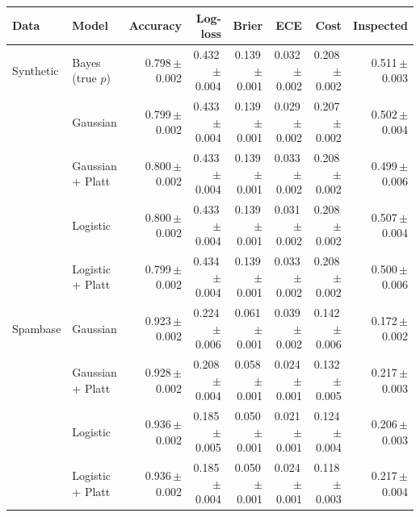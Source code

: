 \begin{tabular}{llrrrrrr}
\toprule
Data & Model & Accuracy & Log-loss & Brier & ECE & Cost & Inspected \\
\midrule
Synthetic & Bayes (true $p$) & 0.798\,{\scriptsize$\pm$0.002} & 0.432\,{\scriptsize$\pm$0.004} & 0.139\,{\scriptsize$\pm$0.001} & 0.032\,{\scriptsize$\pm$0.002} & 0.208\,{\scriptsize$\pm$0.002} & 0.511\,{\scriptsize$\pm$0.003} \\
 & Gaussian & 0.799\,{\scriptsize$\pm$0.002} & 0.433\,{\scriptsize$\pm$0.004} & 0.139\,{\scriptsize$\pm$0.001} & 0.029\,{\scriptsize$\pm$0.002} & 0.207\,{\scriptsize$\pm$0.002} & 0.502\,{\scriptsize$\pm$0.004} \\
 & Gaussian + Platt & 0.800\,{\scriptsize$\pm$0.002} & 0.433\,{\scriptsize$\pm$0.004} & 0.139\,{\scriptsize$\pm$0.001} & 0.033\,{\scriptsize$\pm$0.002} & 0.208\,{\scriptsize$\pm$0.002} & 0.499\,{\scriptsize$\pm$0.006} \\
 & Logistic & 0.800\,{\scriptsize$\pm$0.002} & 0.433\,{\scriptsize$\pm$0.004} & 0.139\,{\scriptsize$\pm$0.001} & 0.031\,{\scriptsize$\pm$0.002} & 0.208\,{\scriptsize$\pm$0.002} & 0.507\,{\scriptsize$\pm$0.004} \\
 & Logistic + Platt & 0.799\,{\scriptsize$\pm$0.002} & 0.434\,{\scriptsize$\pm$0.004} & 0.139\,{\scriptsize$\pm$0.001} & 0.033\,{\scriptsize$\pm$0.002} & 0.208\,{\scriptsize$\pm$0.002} & 0.500\,{\scriptsize$\pm$0.006} \\
\midrule
Spambase & Gaussian & 0.923\,{\scriptsize$\pm$0.002} & 0.224\,{\scriptsize$\pm$0.006} & 0.061\,{\scriptsize$\pm$0.001} & 0.039\,{\scriptsize$\pm$0.002} & 0.142\,{\scriptsize$\pm$0.006} & 0.172\,{\scriptsize$\pm$0.002} \\
 & Gaussian + Platt & 0.928\,{\scriptsize$\pm$0.002} & 0.208\,{\scriptsize$\pm$0.004} & 0.058\,{\scriptsize$\pm$0.001} & 0.024\,{\scriptsize$\pm$0.001} & 0.132\,{\scriptsize$\pm$0.005} & 0.217\,{\scriptsize$\pm$0.003} \\
 & Logistic & 0.936\,{\scriptsize$\pm$0.002} & 0.185\,{\scriptsize$\pm$0.005} & 0.050\,{\scriptsize$\pm$0.001} & 0.021\,{\scriptsize$\pm$0.001} & 0.124\,{\scriptsize$\pm$0.004} & 0.206\,{\scriptsize$\pm$0.003} \\
 & Logistic + Platt & 0.936\,{\scriptsize$\pm$0.002} & 0.185\,{\scriptsize$\pm$0.004} & 0.050\,{\scriptsize$\pm$0.001} & 0.024\,{\scriptsize$\pm$0.001} & 0.118\,{\scriptsize$\pm$0.003} & 0.217\,{\scriptsize$\pm$0.004} \\
\bottomrule
\end{tabular}
